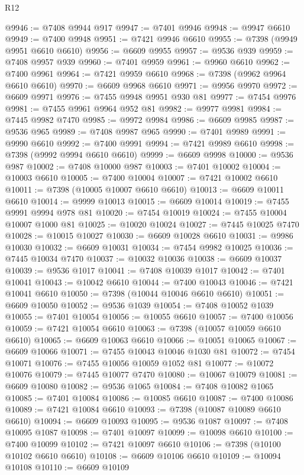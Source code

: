 \begin{lexlean}{R12}
\begin{coremodule}
{{{{{{{{{{{{{{{{{{{{{{{{{{{{{{{{{{{{{{{{{{{{{{{{{{{{{{{{{{{{{{{{{{{{{{{{{{{{{{{{{{@9946 := @7408 @9944 @917
@9947 := @7401 @9946
@9948 := @9947 @6610
@9949 := @7400 @9948
@9951 := @7421 @9946 @6610
@9955 := @7398 (@9949 @9951 @6610 @6610)
@9956 := @6609 @9955
@9957 := @9536 @939
@9959 := @7408 @9957 @939
@9960 := @7401 @9959
@9961 := @9960 @6610
@9962 := @7400 @9961
@9964 := @7421 @9959 @6610
@9968 := @7398 (@9962 @9964 @6610 @6610)
@9970 := @6609 @9968 @6610
@9971 := @9956 @9970
@9972 := @6609 @9971
@9976 := @7455 @9948 @9951 @930 @81
@9977 := @7454 @9976
@9981 := @7455 @9961 @9964 @952 @81
@9982 := @9977 @9981
@9984 := @7445 @9982 @7470
@9985 := @9972 @9984
@9986 := @6609 @9985
@9987 := @9536 @965
@9989 := @7408 @9987 @965
@9990 := @7401 @9989
@9991 := @9990 @6610
@9992 := @7400 @9991
@9994 := @7421 @9989 @6610
@9998 := @7398 (@9992 @9994 @6610 @6610)
@9999 := @6609 @9998
@10000 := @9536 @987
@10002 := @7408 @10000 @987
@10003 := @7401 @10002
@10004 := @10003 @6610
@10005 := @7400 @10004
@10007 := @7421 @10002 @6610
@10011 := @7398 (@10005 @10007 @6610 @6610)
@10013 := @6609 @10011 @6610
@10014 := @9999 @10013
@10015 := @6609 @10014
@10019 := @7455 @9991 @9994 @978 @81
@10020 := @7454 @10019
@10024 := @7455 @10004 @10007 @1000 @81
@10025 := @10020 @10024
@10027 := @7445 @10025 @7470
@10028 := @10015 @10027
@10030 := @6609 @10028 @6610
@10031 := @9986 @10030
@10032 := @6609 @10031
@10034 := @7454 @9982 @10025
@10036 := @7445 @10034 @7470
@10037 := @10032 @10036
@10038 := @6609 @10037
@10039 := @9536 @1017
@10041 := @7408 @10039 @1017
@10042 := @7401 @10041
@10043 := @10042 @6610
@10044 := @7400 @10043
@10046 := @7421 @10041 @6610
@10050 := @7398 (@10044 @10046 @6610 @6610)
@10051 := @6609 @10050
@10052 := @9536 @1039
@10054 := @7408 @10052 @1039
@10055 := @7401 @10054
@10056 := @10055 @6610
@10057 := @7400 @10056
@10059 := @7421 @10054 @6610
@10063 := @7398 (@10057 @10059 @6610 @6610)
@10065 := @6609 @10063 @6610
@10066 := @10051 @10065
@10067 := @6609 @10066
@10071 := @7455 @10043 @10046 @1030 @81
@10072 := @7454 @10071
@10076 := @7455 @10056 @10059 @1052 @81
@10077 := @10072 @10076
@10079 := @7445 @10077 @7470
@10080 := @10067 @10079
@10081 := @6609 @10080
@10082 := @9536 @1065
@10084 := @7408 @10082 @1065
@10085 := @7401 @10084
@10086 := @10085 @6610
@10087 := @7400 @10086
@10089 := @7421 @10084 @6610
@10093 := @7398 (@10087 @10089 @6610 @6610)
@10094 := @6609 @10093
@10095 := @9536 @1087
@10097 := @7408 @10095 @1087
@10098 := @7401 @10097
@10099 := @10098 @6610
@10100 := @7400 @10099
@10102 := @7421 @10097 @6610
@10106 := @7398 (@10100 @10102 @6610 @6610)
@10108 := @6609 @10106 @6610
@10109 := @10094 @10108
@10110 := @6609 @10109
}}}}}}}}}}}}}}}}}}}}}}}}}}}}}}}}}}}}}}}}}}}}}}}}}}}}}}}}}}}}}}}}}}}}}}}}}}}}}}}}}}
\end{coremodule}
\end{lexlean}
